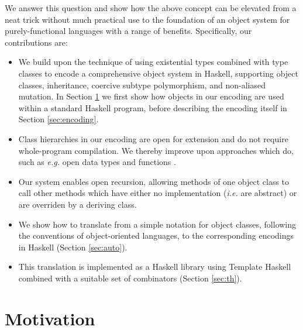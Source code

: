 We answer this question and show how the above concept can be elevated from a neat trick without much practical use to the foundation of an object system for purely-functional languages with a range of benefits. Specifically, our contributions are:
\begin{itemize}
    \item We build upon the technique of using existential types combined with type classes to encode a comprehensive object system in Haskell, supporting object classes, inheritance, coercive subtype polymorphism, and non-aliased mutation. In Section \ref{sec:usage} we first show how objects in our encoding are used within a standard Haskell program, before describing the encoding itself in Section \ref{sec:encoding}.
    \item Class hierarchies in our encoding are open for extension and do not require whole-program compilation. We thereby improve upon approaches which do, such as \emph{e.g.} open data types and functions \cite{loh2006open}.
    \item Our system enables open recursion, allowing methods of one object class to call other methods which have either no implementation (\emph{i.e.} are abstract) or are overriden by a deriving class.
    \item We show how to translate from a simple notation for object classes, following the conventions of object-oriented languages, to the corresponding encodings in Haskell (Section \ref{sec:auto}).
    \item This translation is implemented as a Haskell library using Template Haskell combined with a suitable set of combinators (Section \ref{sec:th}).
\end{itemize}

\section{Motivation}
\label{sec:usage}


